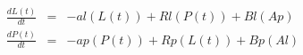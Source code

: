 \documentclass{article}
\begin{document}
\begin{eqnarray*}
  \frac{dL(t)}{dt} &=& -al(L(t)) + Rl(P(t)) + Bl(Ap) \\
  \frac{dP(t)}{dt} &=& -ap(P(t)) + Rp(L(t)) + Bp(Al)
\end{eqnarray*}
\end{document}

